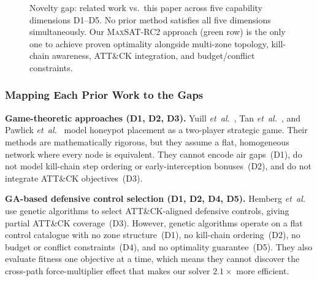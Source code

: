 \documentclass[journal]{IEEEtran}
\newcommand{\cmark}{\textcolor{novelgreen}{\ding{51}}}
\newcommand{\xmark}{\textcolor{novelred}{\ding{55}}}
\newcommand{\etal}{\emph{et~al.}}
\newcommand{\maxsat}{\textsc{MaxSAT}}
\begin{document}
\begin{figure}[!t]
\caption{Novelty gap: related work vs.\ this paper across
five capability dimensions D1--D5.
No prior method satisfies all five dimensions simultaneously.
Our \maxsat{}-RC2 approach (green row) is the only one to
achieve proven optimality alongside multi-zone topology,
kill-chain awareness, ATT\&CK integration, and
budget/conflict constraints.}
\label{fig:novelty_gap}
\end{figure}

\subsubsection{Mapping Each Prior Work to the Gaps}

\textbf{Game-theoretic approaches (\xmark{}D1,
\xmark{}D2, \xmark{}D3).}
Yuill \etal{}~\cite{yuill2004}, Tan \etal{}~\cite{tan2011},
and Pawlick \etal{}~\cite{pawlick2019} model honeypot
placement as a two-player strategic game.
Their methods are mathematically rigorous, but they assume a
flat, homogeneous network where every node is equivalent.
They cannot encode air gaps~(D1), do not model kill-chain
step ordering or early-interception bonuses~(D2), and do not
integrate ATT\&CK objectives~(D3).

\textbf{GA-based defensive control selection
(\xmark{}D1, \xmark{}D2, \xmark{}D4, \xmark{}D5).}
Hemberg \etal{}~\cite{hemberg2020} use genetic algorithms
to select ATT\&CK-aligned defensive controls, giving partial
ATT\&CK coverage~(D3).
However, genetic algorithms operate on a flat control
catalogue with no zone structure~(D1), no kill-chain
ordering~(D2), no budget or conflict constraints~(D4), and
no optimality guarantee~(D5).
They also evaluate fitness one objective at a time, which
means they cannot discover the cross-path force-multiplier
effect that makes our solver $2.1\times$ more efficient.
\end{document}
